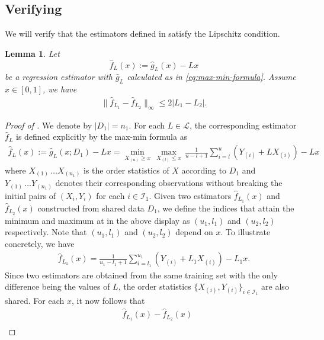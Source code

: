\documentclass[12pt]{article}
\newtheorem{lemma}[theorem]{Lemma}
\begin{document}
\begin{appendices}
\subsection{Verifying }\label{suppsec:application-model-selection}
We will verify that the estimators defined in  satisfy the Lipschitz condition.
\begin{lemma}\label{lm:lipshitz_in_param}
Let 
\begin{equation}
\widehat{f}_{L}(x):=\widehat{g}_{L}(x)-L x
\end{equation}
be a regression estimator with $\widehat g_L$ calculated as in \eqref{eq:max-min-formula}. Assume $x\in[0,1]$, we have
\begin{align*}
    \|\widehat{f}_{ L_1} - \widehat{f}_{L_2}\|_\infty \le 2|L_1 - L_2|.
\end{align*}
\end{lemma}
\begin{proof}[Proof of ] We denote by $|D_1| =n_1$. For each $L \in \mathcal{L}$, the corresponding estimator $\widehat{f}_{L}$ is defined explicitly by the max-min formula \citep{robertson1988order} as
\begin{align*}
    \widehat{f}_{L}(x) :=  \widehat{g}_{L}(x; D_1) - L x = \min_{X_{(u)} \ge x} \, \max_{X_{(l)} \le x} \, \frac{1}{u-l+1}\sum_{i = l}^u (Y_{(i)}+LX_{(i)}) - Lx
\end{align*}
where $X_{(1)}\, \ldots X_{(n_1)}$ is the order statistics of $X$ according to $D_1$ and $Y_{(1)}\, \ldots Y_{(n_1)}$ denotes their corresponding observations without breaking the initial pairs of $(X_i, Y_i)$ for each $i \in \mathcal{I}_1$. Given two estimators $\widehat{f}_{L_1}(x)$ and $\widehat{f}_{L_2}(x)$ constructed from shared data $D_1$, we define the indices that attain the minimum and maximum at in the above display as $(u_1, l_1)$ and $(u_2, l_2)$ respectively. Note that $(u_1, l_1)$ and $(u_2, l_2)$ depend on $x$. To illustrate concretely, we have 
\begin{align*}
    \widehat{f}_{L_1}(x) =  \frac{1}{u_1-l_1+1}\sum_{i = l_1}^{u_1} (Y_{(i)}+L_1X_{(i)}) - L_1x.
\end{align*}
Since two estimators are obtained from the same training set with the only difference being the values of $L$, the order statistics $\{X_{(i)}, Y_{(i)}\}_{i \in \mathcal{I}_1}$ are also shared. For each $x$, it now follows that
    \begin{align*}
       &\widehat{f}_{L_1}(x) - \widehat{f}_{L_2}(x) \\

\end{align*}
\end{proof}
\end{appendices}
\end{document}
